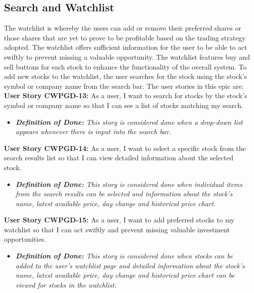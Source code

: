 \subsection{Search and Watchlist}
    \label{subsec:search_watchlist}

The watchlist is whereby the users can add or remove their preferred shares or those shares that are yet to prove to be profitable based on the trading strategy adopted. The watchlist offers sufficient information for the user to be able to act swiftly to prevent missing a valuable opportunity. The watchlist features buy and sell buttons for each stock to enhance the functionality of the overall system. To add new stocks to the watchlist, the user searches for the stock using the stock's symbol or company name from the search bar. The user stories in this epic are:\\

\noindent \textbf{User Story CWPGD-13:} As a user, I want to search for stocks by the stock’s symbol or company name so that I can see a list of stocks matching my search. 
\begin{itemize}
	\item \textit{\textbf{Definition of Done:} This story is considered done when a drop-down list appears whenever there is input into the search bar.} 
\end{itemize}

\noindent \textbf{User Story CWPGD-14:} As a user, I want to select a specific stock from the search results list so that I can view detailed information about the selected stock. 
\begin{itemize}
	\item \textit{\textbf{Definition of Done:} This story is considered done when individual items from the search results can be selected and information about the stock’s name, latest available price, day change and historical price chart.} 
\end{itemize}


\noindent \textbf{User Story CWPGD-15:} As a user, I want to add preferred stocks to my watchlist so that I can act swiftly and prevent missing valuable investment opportunities.
\begin{itemize}
	\item \textit{\textbf{Definition of Done:} This story is considered done when stocks can be added to the user’s watchlist page and detailed information about the stock’s name, latest available price, day change and historical price chart can be viewed for stocks in the watchlist.} 
\end{itemize}


